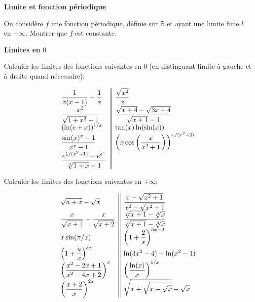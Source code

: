 \documentclass[a4paper,12pt]{article}
\newenvironment{disarray}%
 {\everymath{\displaystyle\everymath{}}\array}%
 {\endarray}
\begin{document}
\Exo \textbf{Limite et fonction périodique}

On considère $f$ une fonction périodique, définie sur $\mathbb{R}$ et ayant une limite finie $l$ en $+\infty$. Montrer que $f$ est constante. 

\Exo \textbf{Limites en $0$}

Calculer les limites des fonctions suivantes en $0$ (en distinguant limite à gauche et à droite quand nécessaire):

\begin{equation*}
  \begin{disarray}{l||l}
    \frac{1}{x(x-1)} - \frac{1}{x} & \frac{\sqrt{x^2}}{x} \\
    \frac{x^2}{\sqrt{1+x^2} - 1} & \frac{\sqrt{x+4} - \sqrt{3x+4}}{\sqrt{x+1} - 1} \\
    (\ln(e+x))^{1/x} & \tan(x) \ln(\sin(x)) \\
    \frac{\sin(x)^x - 1}{x^x - 1} & \left(x \cos\left( \frac{x}{x^2 + 1}\right) \right)^{x/(x^2+2)} \\
    \frac{e^{1/(x^2+1)} - e^{e^x}}{\sqrt[3]{1+x} - 1} & 
  \end{disarray}
\end{equation*}

Calculer les limites des fonctions suivantes en $+\infty$:

\begin{equation*}
  \begin{disarray}{l||l}
    \sqrt{a+x} - \sqrt{x} & \frac{x - \sqrt{x^2+1}}{x^2 - \sqrt{x^2+1}} \\
    \frac{x}{\sqrt{x+1}} - \frac{x}{\sqrt{x+2}} & \frac{\sqrt[4]{x+1} - \sqrt[4]{x}}{\sqrt[3]{x+1} - \sqrt[3]{x}} \\
    x \sin(\pi/x) & \left( 1 + \frac{2}{x} \right)^{3x-2} \\
    \left( 1 + \frac{a}{x} \right)^{bx} & \ln(3x^2 - 4) - \ln(x^2 - 1) \\
    \left( \frac{x^2 - 2x + 1}{x^2 - 4x + 2} \right)^x & \left( \frac{\ln(x)}{x} \right)^{1/x} \\
    \left( \frac{x+2}{x} \right)^{2x} & \sqrt{x + \sqrt{x + \sqrt{x}}} - \sqrt{x} \\
  \end{disarray}
\end{equation*}
\end{document}
